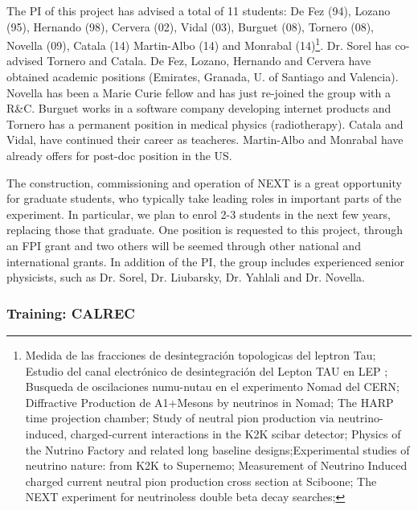 The PI of this project has advised a total of 11 students: De Fez (94), Lozano (95), Hernando (98), Cervera (02), Vidal (03), Burguet (08), Tornero (08), Novella (09), Catala (14) Martin-Albo (14) and Monrabal (14)\footnote{Medida de las fracciones de desintegración topologicas del leptron Tau; Estudio del canal electrónico de desintegración del Lepton TAU en LEP ; Busqueda de oscilaciones numu-nutau en el experimento Nomad del CERN; Diffractive Production de A1+Mesons by neutrinos in Nomad; The HARP time projection chamber; Study of neutral pion production via neutrino-induced, charged-current interactions in the K2K scibar detector; Physics of the Nutrino Factory and related long baseline designs;Experimental studies of neutrino nature: from K2K to Supernemo; Measurement of Neutrino Induced charged current neutral pion production cross section at Sciboone; The NEXT experiment for neutrinoless double beta decay searches; }. Dr. Sorel has co-advised Tornero and Catala. De Fez, Lozano, Hernando and Cervera have obtained academic positions (Emirates, Granada, U. of Santiago and Valencia). Novella has been a Marie Curie fellow and has just re-joined the group with a R\&C. Burguet works in a software company developing internet products and Tornero has a permanent position in medical physics (radiotherapy). Catala and Vidal, have continued their career as teacheres. Martin-Albo and Monrabal have already offers for post-doc position in the US.

The construction, commissioning and operation of NEXT is a great opportunity for graduate students, who typically take leading roles in important parts of the experiment. In particular, we plan to enrol 2-3 students in the next few years, replacing those that graduate. One position is requested to this project, through an FPI grant and two others will be seemed through other national and international grants. In addition of the PI, the group includes experienced senior physicists, such as Dr. Sorel, Dr. Liubarsky, Dr. Yahlali and Dr. Novella. 

\subsubsection*{Training: CALREC}

